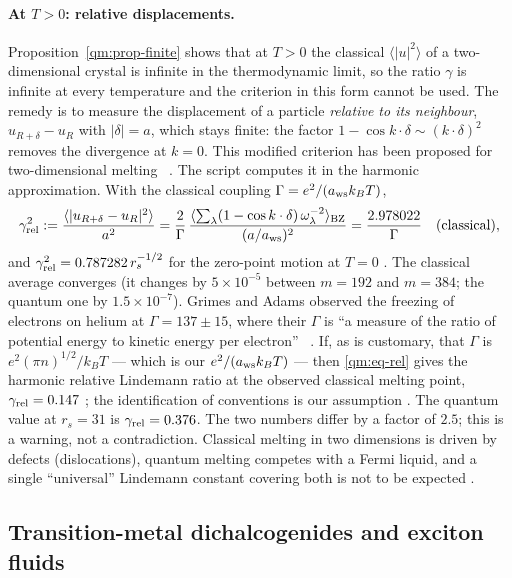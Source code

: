 \paragraph{At $T>0$: relative displacements.} Proposition~\ref{qm:prop-finite} shows that at $T>0$ the classical
$\langle|u|^2\rangle$ of a two-dimensional crystal is infinite in the thermodynamic limit, so the ratio $\gamma$ is
infinite at every temperature and the criterion in this form cannot be used. The remedy is to measure the displacement of a
particle \emph{relative to its neighbour}, $u_{R+\delta}-u_R$ with $|\delta|=a$, which stays finite: the factor
$1-\cos k\cdot\delta\sim(k\cdot\delta)^2$ removes the divergence at $k=0$. This modified criterion has been
proposed for two-dimensional melting~\cite{bedanov} \tierL. The script computes it in the harmonic approximation.
With the classical coupling $\Gamma=e^2/(a_{\rm ws}k_BT)$,
\begin{equation}\label{qm:eq-rel}
\gamma_{\rm rel}^2:=\frac{\langle|u_{R+\delta}-u_R|^2\rangle}{a^2}
=\frac{2}{\Gamma}\,\frac{\langle\sum_\lambda(1-\cos k\cdot\delta)\,\omega_{\lambda}^{-2}\rangle_{\rm BZ}}{(a/a_{\rm ws})^2}
=\frac{2.978022}{\Gamma}\quad\text{(classical)},
\end{equation}
and $\gamma_{\rm rel}^2=0.787282\,r_s^{-1/2}$ for the zero-point motion at $T=0$ \tierX. The classical average
converges (it changes by $5\times10^{-5}$ between $m=192$ and $m=384$; the quantum one by $1.5\times10^{-7}$). Grimes and
Adams observed the freezing of electrons on helium at $\Gamma=137\pm15$, where their $\Gamma$ is ``a measure of the
ratio of potential energy to kinetic energy per electron''~\cite{grimes} \tierL. If, as is customary, that $\Gamma$ is
$e^2(\pi n)^{1/2}/k_BT$ --- which is our $e^2/(a_{\rm ws}k_BT)$ --- then \eqref{qm:eq-rel} gives the harmonic relative
Lindemann ratio at the observed classical melting point, $\gamma_{\rm rel}=0.147$ \tierX; the identification of
conventions is our assumption \tierC. The quantum value at $r_s=31$ is $\gamma_{\rm rel}=0.376$. The two numbers
differ by a factor of $2.5$; this is a warning, not a contradiction. Classical melting in two dimensions is driven by
defects (dislocations), quantum melting competes with a Fermi liquid, and a single ``universal'' Lindemann constant
covering both is not to be expected \tierC.

\subsection{Transition-metal dichalcogenides and exciton fluids}\label{qm:sec-tmd}

